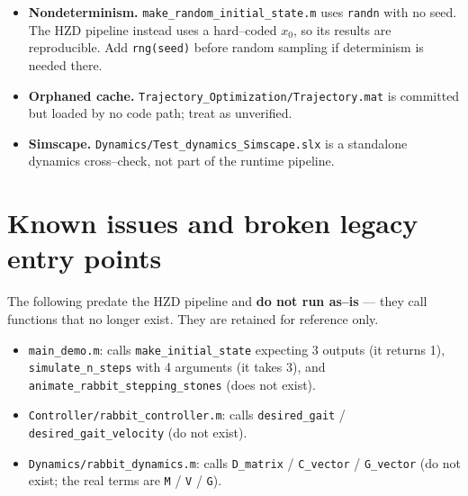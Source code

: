 \documentclass[11pt,a4paper]{article}
\newcommand{\code}[1]{\texttt{#1}}          %
\newcommand{\fname}[1]{\texttt{#1}}          %
\newcommand{\warn}[1]{\textcolor{red!70!black}{\textbf{#1}}}
\begin{document}
\begin{itemize}
        \ref{fig:limitcycle}) are not hand--drawn: they are produced by
        \fname{Visualization/make\_doc\_figures.m} from the newest
        \fname{Results/col\_result\_*.mat} --- here
        \fname{col\_result\_2026-07-23\_00-45-04.mat} --- into
        \fname{docs/figures/}. After the reference gait changes, re--run that
        script and recompile (\code{pdflatex} twice, for the cross--references)
        so the figures and the prose cannot drift apart.
  \item \textbf{Nondeterminism.} \fname{make\_random\_initial\_state.m} uses
        \code{randn} with no seed. The HZD pipeline instead uses a hard--coded
        $x_0$, so its results are reproducible. Add \code{rng(seed)} before
        random sampling if determinism is needed there.
  \item \textbf{Orphaned cache.} \fname{Trajectory\_Optimization/Trajectory.mat}
        is committed but loaded by no code path; treat as unverified.
  \item \textbf{Simscape.} \fname{Dynamics/Test\_dynamics\_Simscape.slx} is a
        standalone dynamics cross--check, not part of the runtime pipeline.
\end{itemize}

\section{Known issues and broken legacy entry points}
\label{sec:known}
The following predate the HZD pipeline and \warn{do not run as--is} --- they
call functions that no longer exist. They are retained for reference only.
\begin{itemize}
  \item \fname{main\_demo.m}: calls \code{make\_initial\_state} expecting 3
        outputs (it returns 1), \code{simulate\_n\_steps} with 4 arguments (it
        takes 3), and \code{animate\_rabbit\_stepping\_stones} (does not exist).
  \item \fname{Controller/rabbit\_controller.m}: calls \code{desired\_gait} /
        \code{desired\_gait\_velocity} (do not exist).
  \item \fname{Dynamics/rabbit\_dynamics.m}: calls \code{D\_matrix} /
        \code{C\_vector} / \code{G\_vector} (do not exist; the real terms are
        \code{M} / \code{V} / \code{G}).
\end{itemize}
\end{document}
